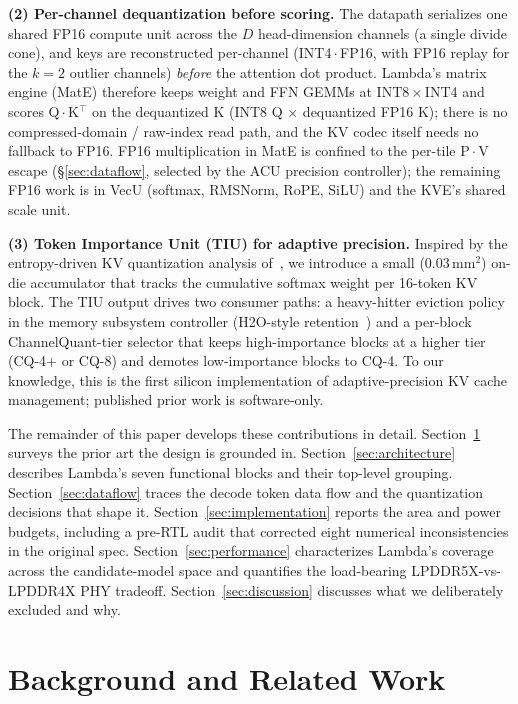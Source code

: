 \documentclass[conference]{IEEEtran}
\begin{document}
\textbf{(2) Per-channel dequantization before scoring.} The datapath serializes one shared FP16 compute unit across the $D$ head-dimension channels (a single divide cone), and keys are reconstructed per-channel (INT4\,$\cdot$\,FP16, with FP16 replay for the $k{=}2$ outlier channels) \emph{before} the attention dot product. Lambda's matrix engine (MatE) therefore keeps weight and FFN GEMMs at INT8\,$\times$\,INT4 and scores Q\,$\cdot$\,K$^\top$ on the dequantized K (INT8 Q $\times$ dequantized FP16 K); there is no compressed-domain / raw-index read path, and the KV codec itself needs no fallback to FP16. FP16 multiplication in MatE is confined to the per-tile P\,$\cdot$\,V escape (\S\ref{sec:dataflow}, selected by the ACU precision controller); the remaining FP16 work is in VecU (softmax, RMSNorm, RoPE, SiLU) and the KVE's shared scale unit.

\textbf{(3) Token Importance Unit (TIU) for adaptive precision.} Inspired by the entropy-driven KV quantization analysis of~\cite{adaptive_kv}, we introduce a small (0.03\,mm$^2$) on-die accumulator that tracks the cumulative softmax weight per 16-token KV block. The TIU output drives two consumer paths: a heavy-hitter eviction policy in the memory subsystem controller (H2O-style retention~\cite{h2o}) and a per-block ChannelQuant-tier selector that keeps high-importance blocks at a higher tier (CQ-4+ or CQ-8) and demotes low-importance blocks to CQ-4. To our knowledge, this is the first silicon implementation of adaptive-precision KV cache management; published prior work is software-only.

The remainder of this paper develops these contributions in detail. Section~\ref{sec:background} surveys the prior art the design is grounded in. Section~\ref{sec:architecture} describes Lambda's seven functional blocks and their top-level grouping. Section~\ref{sec:dataflow} traces the decode token data flow and the quantization decisions that shape it. Section~\ref{sec:implementation} reports the area and power budgets, including a pre-RTL audit that corrected eight numerical inconsistencies in the original spec. Section~\ref{sec:performance} characterizes Lambda's coverage across the candidate-model space and quantifies the load-bearing LPDDR5X-vs-LPDDR4X PHY tradeoff. Section~\ref{sec:discussion} discusses what we deliberately excluded and why.

\section{Background and Related Work}
\label{sec:background}
\end{document}

